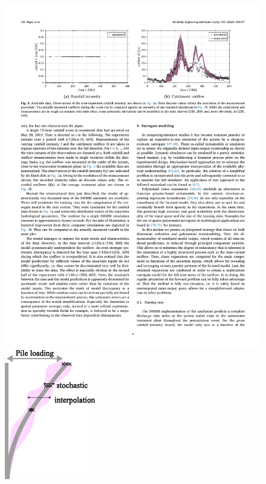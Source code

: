 \begin{frame}
\begin{figure}
    \includegraphics[scale=0.6]{figures/figure-UQtype3.pdf}
    \hfill
    \includegraphics[scale=0.9]{figures/figure-UQtype4.pdf}    
    \end{figure}

\end{frame}